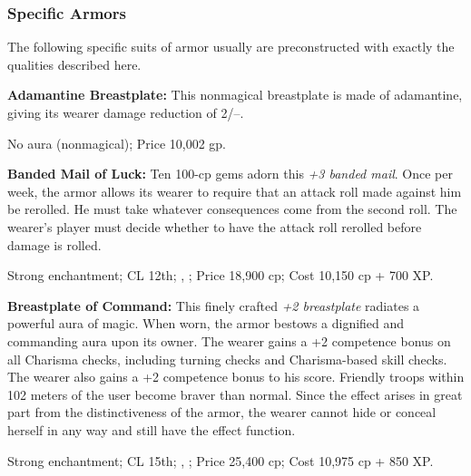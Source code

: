 
\subsubsection{Specific Armors}
The following specific suits of armor usually are preconstructed with exactly the qualities described here.

\textbf{Adamantine Breastplate:} This nonmagical breastplate is made of adamantine, giving its wearer damage reduction of 2/--.

No aura (nonmagical); Price 10,002 gp.

\textbf{Banded Mail of Luck:} Ten 100-cp gems adorn this \emph{+3 banded mail}. Once per week, the armor allows its wearer to require that an attack roll made against him be rerolled. He must take whatever consequences come from the second roll. The wearer's player must decide whether to have the attack roll rerolled before damage is rolled.

Strong enchantment; CL 12th; , ; Price 18,900 cp; Cost 10,150 cp + 700 XP.

\textbf{Breastplate of Command:} This finely crafted \emph{+2 breastplate} radiates a powerful aura of magic. When worn, the armor bestows a dignified and commanding aura upon its owner. The wearer gains a +2 competence bonus on all Charisma checks, including turning checks and Charisma-based skill checks. The wearer also gains a +2 competence bonus to his  score. Friendly troops within 102 meters of the user become braver than normal. Since the effect arises in great part from the distinctiveness of the armor, the wearer cannot hide or conceal herself in any way and still have the effect function.

Strong enchantment; CL 15th; , ; Price 25,400 cp; Cost 10,975 cp + 850 XP.

